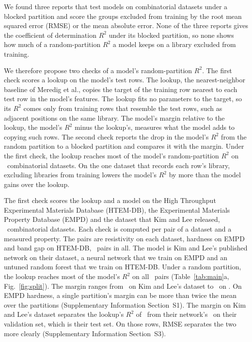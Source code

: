 \documentclass[11pt]{article}
\begin{document}
We found three reports that test models on combinatorial datasets under a
blocked partition and score the groups excluded from training by the root mean
squared error (RMSE) or the mean absolute
error.\cite{zakutayev2018htem,thelen2025electrocatalyst,kim2025descriptors}
None of the three reports gives the coefficient of determination $R^2$
under its blocked partition, so none shows how much of a random-partition $R^2$
a model keeps on a library excluded from training.

We therefore propose two checks of a model's random-partition $R^2$. The first
check
scores a lookup on the model's test rows. The lookup, the
nearest-neighbor baseline of Meredig et al.,\cite{meredig2018extrapolation}
copies the target of the training row nearest to each test row in the model's
features. The
lookup fits no parameters to the target, so its $R^2$ comes only from training
rows that resemble the test rows, such as adjacent positions on the same
library. The model's margin relative to the lookup, the model's $R^2$
minus the lookup's, measures what the model adds to copying such rows. The
second check reports the drop in the model's $R^2$ from the random partition
to a blocked partition and compares it with the margin. Under the first check, the lookup reaches most of
the model's random-partition $R^2$ on \libraryDatasets\ combinatorial datasets. On the one dataset that records each row's library, excluding libraries
from training lowers the model's $R^2$ by more than the model gains over the
lookup.

\label{par:margin}
The first check scores the lookup and a model on the High Throughput
Experimental Materials Database (HTEM-DB),\cite{zakutayev2018htem} the
Experimental Materials Property Database (EMPD)\cite{aihubMaterials} and the
dataset that Kim and Lee released,\cite{kim2025descriptors}
\libraryDatasets\ combinatorial datasets. Each check is computed per pair of a
dataset and a measured property. The pairs are resistivity on each dataset,
hardness on EMPD and band gap on HTEM-DB, \randomPairs\ pairs in all. The model
is Kim and Lee's published network on their dataset, a neural network that we
train on EMPD and an untuned random forest that we train on HTEM-DB. Under a
random partition, the lookup reaches most of the model's $R^2$ on all
\randomPairs\ pairs (Table~\ref{tab:main}a, Fig.~\ref{fig:split}). The
margin ranges from \npjMargin\ on Kim and Lee's
dataset to \largestRandomMargin\ on \largestRandomMarginPair. On EMPD hardness,
a single partition's margin can be more than twice the mean over the partitions
(Supplementary Information Section~S1). The margin on Kim
and Lee's dataset separates the lookup's $R^2$ of \npjLookupRSq\ from their
network's \npjModelRSq\ on their validation set, which is their test set. On
those rows, RMSE separates the two more clearly (Supplementary Information
Section~S3).
\end{document}
